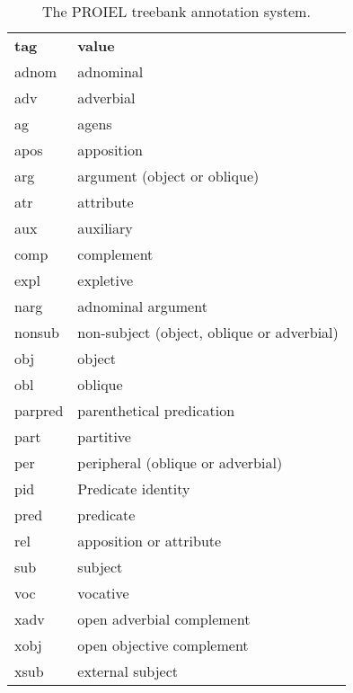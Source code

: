 \begin{table}
  \begin{tabular}{|l|l|}
    \hline
    \textbf{tag} & \textbf{value} \\ \thickhline
    adnom & adnominal \\
    adv & adverbial \\
    ag & agens \\
    apos & apposition \\
    arg & argument (object or oblique) \\
    atr & attribute \\
    aux & auxiliary \\
    comp & complement \\
    expl & expletive \\
    narg & adnominal argument \\
    nonsub & non-subject (object, oblique or adverbial) \\
    obj & object \\
    obl & oblique \\
    parpred & parenthetical predication \\
    part & partitive \\
    per & peripheral (oblique or adverbial) \\
    pid & Predicate identity \\
    pred & predicate \\
    rel & apposition or attribute \\
    sub & subject \\
    voc & vocative \\
    xadv & open adverbial complement \\
    xobj & open objective complement \\
    xsub & external subject \\
  \end{tabular}
  \caption{The PROIEL treebank annotation system.} \label{table:proiellemmata}
\end{table}

